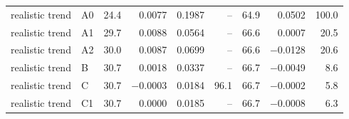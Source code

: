 \begin{table}
{\begin{tabular}{llrrrrrrr}
realistic trend & A0 & 24.4 & 0.0077 & 0.1987 & -- & 64.9 & 0.0502 & 100.0 \\
realistic trend & A1 & 29.7 & 0.0088 & 0.0564 & -- & 66.6 & 0.0007 & 20.5 \\
realistic trend & A2 & 30.0 & 0.0087 & 0.0699 & -- & 66.6 & \ensuremath{-}0.0128 & 20.6 \\
realistic trend & B & 30.7 & 0.0018 & 0.0337 & -- & 66.7 & \ensuremath{-}0.0049 & 8.6 \\
realistic trend & C & 30.7 & \ensuremath{-}0.0003 & 0.0184 & 96.1 & 66.7 & \ensuremath{-}0.0002 & 5.8 \\
realistic trend & C1 & 30.7 & 0.0000 & 0.0185 & -- & 66.7 & \ensuremath{-}0.0008 & 6.3 \\
\bottomrule
\end{tabular}
}
\end{table}

\begin{table}
\caption{E9 real incomplete station-years: share admitted by the label-free rule (R7b, applied within each region) and by four published rules (no truth is available; this is an application).}
\label{tab:si_application}
\centering
\scriptsize
{}
\end{table}


